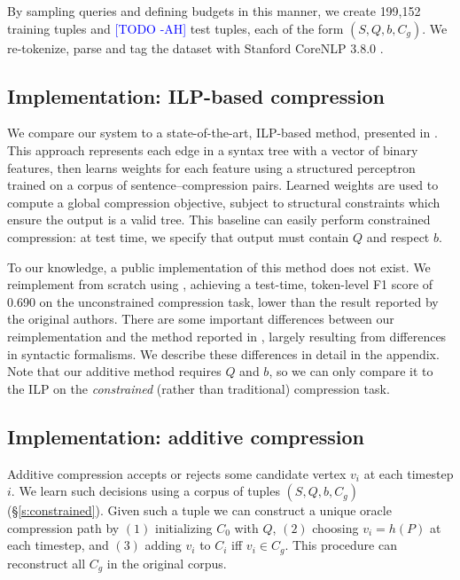 \documentclass[11pt,a4paper]{article}
\newcommand{\ahcomment}[1]{\textcolor{blue}{[#1 -AH]}}
\begin{document}
By sampling queries and defining budgets in this manner, we create {199,152} training tuples and {\ahcomment{TODO}} test tuples, each of the form $(S,Q,b,C_g)$. We re-tokenize, parse and tag the dataset with Stanford CoreNLP 3.8.0 \cite{corenlp}.

\subsection{Implementation: ILP-based compression}\label{s:ilp}

We compare our system to a state-of-the-art, ILP-based method, presented in \citet{filippova2013overcoming}. This approach represents each edge in a syntax tree with a vector of binary features, then learns weights for each feature using a structured perceptron trained on a corpus of sentence--compression pairs. Learned weights are used to compute a global compression objective, subject to structural constraints which ensure the output is a valid tree. This baseline can easily perform constrained compression: at test time, we specify that output must contain $Q$ and respect $b$.

To our knowledge, a public implementation of this method does not exist. We reimplement from scratch using \citet{gurobi}, achieving a test-time, token-level F1 score of  0.690 on the unconstrained compression task, lower than the result reported by the original authors. There are some important differences between our reimplementation and the method reported in \citet{filippova2013overcoming}, largely resulting from differences in syntactic formalisms. We describe these differences in detail in the appendix. Note that our additive method requires $Q$ and $b$, so we can only compare it to the ILP on the \textit{constrained} (rather than traditional) compression task.

\subsection{Implementation: additive compression}\label{s:transition}

Additive compression accepts or rejects some candidate vertex $v_i$ at each timestep $i$. 
We learn such decisions using a corpus of tuples $(S,Q,b,C_g)$ (\S\ref{s:constrained}). Given such a tuple we can construct a unique oracle compression path by $(1)$ initializing $C_0$ with $Q$, $(2)$ choosing $v_i = h(P)$ at each timestep, and $(3)$ adding $v_i$ to $C_i$ iff $v_i \in C_g$. This procedure can reconstruct all $C_g$ in the original \citet{filippova2013overcoming} corpus. 
\end{document}
